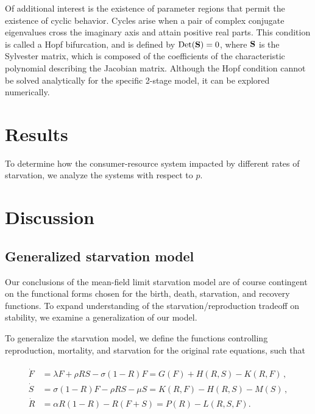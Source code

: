 \documentclass[11pt]{article}
\begin{document}
Of additional interest is the existence of parameter regions that permit the
existence of cyclic behavior.  Cycles arise when a pair of complex conjugate
eigenvalues cross the imaginary axis and attain positive real parts.  This
condition is called a Hopf bifurcation, and is defined by
${\rm Det}({\bf S}) = 0$, where $\bf S$ is the Sylvester matrix, which is
composed of the coefficients of the characteristic polynomial describing the
Jacobian matrix.  Although the Hopf condition cannot be solved analytically
for the specific 2-stage model, it can be explored numerically.


\section{Results}

To determine how the consumer-resource system impacted by different rates of starvation, we analyze the systems with respect to $p$.


\section{Discussion}




\subsection{Generalized starvation model}
Our conclusions of the mean-field limit starvation model are of course contingent on the functional forms chosen for the birth, death, starvation, and recovery functions.
To expand understanding of the starvation/reproduction tradeoff on stability, we examine a generalization of our model.

To generalize the starvation model, we define the functions controlling reproduction, mortality, and starvation for the original rate equations, such that

\begin{align}
  \label{GE}
\begin{split}
\dot F &= \lambda F + \rho  RS - \sigma (1-R)F = G(F) + H(R,S) - K(R,F)\,,\\
\dot S &= \sigma (1-R)F - \rho RS - \mu S = K(R,F) - H(R,S) - M(S)\,, \\
\dot R &= \alpha R(1-R) -  R(F+S) = P(R) - L(R,S,F).\\
\end{split}
\end{align}
\end{document}
